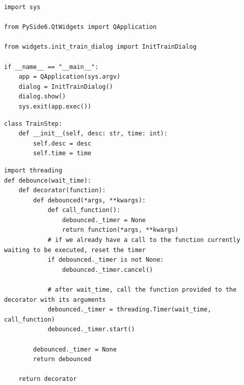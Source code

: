 \documentclass[a4paper,14pt]{extarticle}
\begin{document}
\begin{verbatim}
import sys

from PySide6.QtWidgets import QApplication

from widgets.init_train_dialog import InitTrainDialog

if __name__ == "__main__":
    app = QApplication(sys.argv)
    dialog = InitTrainDialog()
    dialog.show()
    sys.exit(app.exec())
\end{verbatim}
\begin{verbatim}
class TrainStep:
    def __init__(self, desc: str, time: int):
        self.desc = desc
        self.time = time
\end{verbatim}

\begin{verbatim}
import threading
def debounce(wait_time):
    def decorator(function):
        def debounced(*args, **kwargs):
            def call_function():
                debounced._timer = None
                return function(*args, **kwargs)
            # if we already have a call to the function currently waiting to be executed, reset the timer
            if debounced._timer is not None:
                debounced._timer.cancel()

            # after wait_time, call the function provided to the decorator with its arguments
            debounced._timer = threading.Timer(wait_time, call_function)
            debounced._timer.start()

        debounced._timer = None
        return debounced

    return decorator
\end{verbatim}
\end{document}

